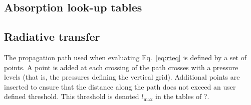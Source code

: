 \subsection{Absorption look-up tables}
\label{sec:b:abstable}
%



\subsection{Radiative transfer}
\label{sec:b:rt}
%
The propagation path used when evaluating Eq.~\ref{eq:rteq} is defined by a set
of points. A point is added at each crossing of the path crosses with a
pressure levels (that is, the pressures defining the vertical grid). Additional
points are inserted to ensure that the distance along the path does not exceed
an user defined threshold. This threshold is denoted $l_\mathrm{max}$ in the
tables of ?.





